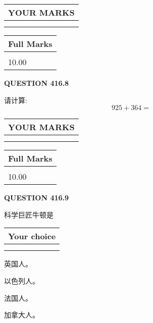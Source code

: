 \documentclass{ctexart}
\begin{document}
\noindent\begin{tabular}{|l|}
\hline
 YOUR MARKS  \\
\hline
 \\ 
 \\ 
\hline
\end{tabular}
\hspace{0.05in} \begin{tabular}{|l|}
\hline
 Full Marks  \\
\hline
 \\ 
10.00 \\
\hline
\end{tabular}
{\textbf{\Large{QUESTION
416.8 
}}}
  
  
 
请计算:
\begin{equation}
925 +  %
364 = \nonumber
\end{equation}
 

 

 
  
\vspace{0.2in}
  
\noindent\begin{tabular}{|l|}
\hline
 YOUR MARKS  \\
\hline
 \\ 
 \\ 
\hline
\end{tabular}
\hspace{0.05in} \begin{tabular}{|l|}
\hline
 Full Marks  \\
\hline
 \\ 
10.00 \\
\hline
\end{tabular}
{\textbf{\Large{QUESTION
416.9 
}}}
  
  
科学巨匠牛顿是
  
  
\noindent\hspace{3.0in} \begin{tabular}{|l|}
\hline
Your choice \\
\hline
 \\ 
 \\ 
\hline
\end{tabular}
  
  
 
 
英国人。
 
 
以色列人。
 
 
法国人。
 
 
加拿大人。
 
\end{document}
